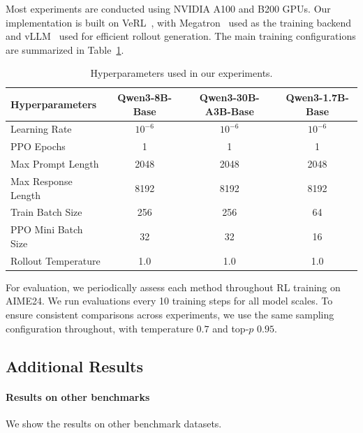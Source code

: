 \documentclass[11pt]{article}
\theoremstyle{remark}
\begin{document}
Most experiments are conducted using NVIDIA A100 and B200 GPUs. Our
implementation is built on VeRL~\citep{sheng2024verl}, with
Megatron~\citep{shoeybi2019megatron} used as the training backend and
vLLM~\citep{kwon2023efficient} used for efficient rollout generation.
The main training configurations are summarized in Table~\ref{tab:hyperparameters}.

\begin{table}[t]
    \centering
    \caption{Hyperparameters used in our experiments.}
    \label{tab:hyperparameters}
    \small
    \begin{tabular}{lccc}
        \toprule
        \textbf{Hyperparameters}
        & \textbf{Qwen3-8B-Base}
        & \textbf{Qwen3-30B-A3B-Base}
        & \textbf{Qwen3-1.7B-Base} \\
        \midrule
        Learning Rate       & $10^{-6}$ & $10^{-6}$ & $10^{-6}$ \\
        PPO Epochs           & 1         & 1         & 1         \\
        Max Prompt Length    & 2048      & 2048      & 2048      \\
        Max Response Length  & 8192      & 8192      & 8192      \\
        Train Batch Size     & 256       & 256       & 64        \\
        PPO Mini Batch Size  & 32        & 32        & 16        \\
        Rollout Temperature  & 1.0       & 1.0       & 1.0       \\
        \bottomrule
    \end{tabular}
\end{table}

For evaluation, we periodically assess each method throughout RL training on
AIME24. We run evaluations every 10 training steps for all model scales. To
ensure consistent comparisons across experiments, we use the same sampling
configuration throughout, with temperature $0.7$ and top-$p$ $0.95$.
\subsection{Additional Results}

\paragraph{Results on other benchmarks}

We show the results on other benchmark datasets.
\end{document}
